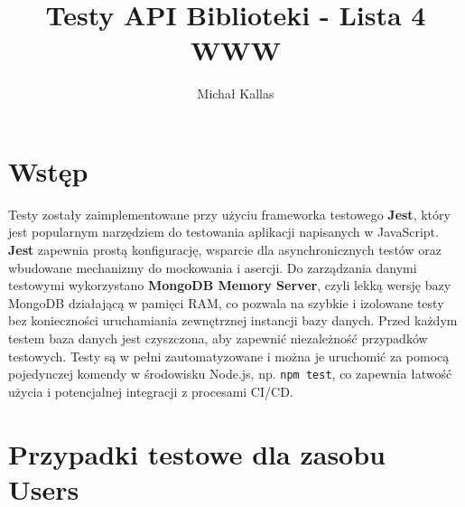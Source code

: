 \documentclass{article}
\title{Testy API Biblioteki - Lista 4 WWW}
\author{Michał Kallas}
\date{}
\begin{document}
\maketitle

\section{Wstęp}
Testy zostały zaimplementowane przy użyciu frameworka testowego \textbf{Jest}, który jest popularnym narzędziem do testowania aplikacji napisanych w JavaScript.
\textbf{Jest} zapewnia prostą konfigurację, wsparcie dla asynchronicznych testów oraz wbudowane mechanizmy do mockowania i asercji.
Do zarządzania danymi testowymi wykorzystano \textbf{MongoDB Memory Server}, czyli lekką wersję bazy MongoDB działającą w pamięci RAM, co pozwala na szybkie i izolowane testy bez konieczności uruchamiania zewnętrznej instancji bazy danych.
Przed każdym testem baza danych jest czyszczona, aby zapewnić niezależność przypadków testowych.
Testy są w pełni zautomatyzowane i można je uruchomić za pomocą pojedynczej komendy w środowisku Node.js, np. \texttt{npm test}, co zapewnia łatwość użycia i potencjalnej integracji z procesami CI/CD.

\section{Przypadki testowe dla zasobu Users}
\end{document}
